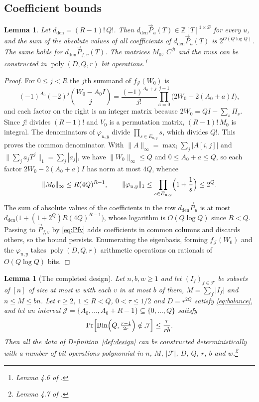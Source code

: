 \documentclass[11pt,reqno]{amsart}
\numberwithin{equation}{section}
\theoremstyle{plain}
\newtheorem{lemma}[theorem]{Lemma}
\theoremstyle{definition}
\theoremstyle{remark}
\DeclareMathOperator{\Bin}{Bin}
\DeclareMathOperator{\poly}{poly}
\newcommand{\F}{\mathcal{F}}
\newcommand{\B}{\mathcal{B}}
\newcommand{\Z}{\mathbb{Z}}
\newcommand{\PP}{\vec{P}}
\begin{document}
\subsection{Coefficient bounds}
\begin{lemma}\label{lem:coeff}
Let $d_{\mathrm{den}}=(R-1)!\,Q!$. Then $d_{\mathrm{den}}\PP_u(T)\in\Z[T]^{1\times\B}$
for every $u$, and the sum of the absolute values of all coefficients of
$d_{\mathrm{den}}\PP_u(T)$ is $2^{O(Q\log Q)}$. The same holds for
$d_{\mathrm{den}}\PP_{f,v}(T)$. The matrices $M_0$, $C^{\B}$ and the rows can be
constructed in $\poly(D,Q,r)$ bit operations.\footnote{Lemma 4.6 of
\cite{OAI26}.}
\end{lemma}

\begin{proof}
For $0\le j<R$ the $j$th summand of $f_{\mathcal J}(W_0)$ is
\[
  (-1)^{A_0}(-2)^j\binom{W_0-A_0I}{j}=\frac{(-1)^{A_0+j}}{j!}\prod_{a=0}^{j-1}\bigl(2W_0-2(A_0+a)I\bigr),
\]
and each factor on the right is an integer matrix because
$2W_0=QI-\sum_s\Pi_s$. Since $j!$ divides $(R-1)!$ and $V_0$ is a permutation
matrix, $(R-1)!\,M_0$ is integral. The denominators of $\varphi_{u,y}$ divide
$\prod_{s\in E_{u,y}}s$, which divides $Q!$. This proves the common denominator.
With $\|A\|_\infty=\max_i\sum_j|A[i,j]|$ and $\|\sum_ja_jT^j\|_1=\sum_j|a_j|$,
we have $\|W_0\|_\infty\le Q$ and $0\le A_0+a\le Q$, so each factor
$2W_0-2(A_0+a)I$ has norm at most $4Q$, whence
\[
  \|M_0\|_\infty\le R(4Q)^{R-1},\qquad \|\varphi_{u,y}\|_1\le\prod_{s\in E_{u,y}}\Bigl(1+\frac1s\Bigr)\le 2^{Q}.
\]
The sum of absolute values of the coefficients in the row $d_{\mathrm{den}}\PP_u$
is at most $d_{\mathrm{den}}\bigl(1+(1+2^Q)R(4Q)^{R-1}\bigr)$, whose logarithm is
$O(Q\log Q)$ since $R<Q$. Passing to $\PP_{f,v}$ by \eqref{eq:Pfv} adds
coefficients in common columns and discards others, so the bound persists.
Enumerating the eigenbasis, forming $f_{\mathcal J}(W_0)$ and the $\varphi_{u,y}$
takes $\poly(D,Q,r)$ arithmetic operations on rationals of $O(Q\log Q)$ bits.
\end{proof}

\begin{lemma}[The completed design]\label{lem:complete}
Let $n,b,w\ge1$ and let $(I_f)_{f\in\F}$ be subsets of $[n]$ of size at most $w$
with each $v$ in at most $b$ of them, $M=\sum_f|I_f|$ and $n\le M\le bn$. Let
$r\ge2$, $1\le R<Q$, $0<\tau\le1/2$ and $D=r^{2Q}$ satisfy \eqref{eq:balance},
and let an interval $\mathcal J=\{A_0,\dots,A_0+R-1\}\subseteq\{0,\dots,Q\}$
satisfy
\begin{equation}\label{eq:tailreq}
  \Pr\Bigl[\Bin\Bigl(Q,\tfrac{r-1}{2r}\Bigr)\notin\mathcal J\Bigr]\le\frac{\tau}{rb}.
\end{equation}
Then all the data of Definition~\ref{def:design} can be constructed
deterministically with a number of bit operations polynomial in
$n$, $M$, $|\F|$, $D$, $Q$, $r$, $b$ and $w$.\footnote{Lemma 4.7
of \cite{OAI26}.}
\end{lemma}
\end{document}
